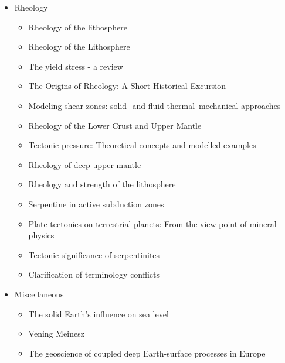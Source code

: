 \begin{itemize}
\item Rheology 
   \begin{itemize}
   \item [\nineteeneightythree] Rheology of the lithosphere \cite{kirb83}
   \item [\nineteeneightyseven] Rheology of the Lithosphere \cite{kikr87} \cite{ramu87}
   \item [\nineteenninetynine] The yield stress - a review \cite{barn99}
   \item [\twothousandtwo] The Origins of Rheology: A Short Historical Excursion \cite{dora02}
   \item [\twothousandthree] Modeling shear zones: solid- and fluid-thermal–mechanical approaches \cite{reyu03}
   \item [\twothousandeight] Rheology of the Lower Crust and Upper Mantle \cite{budr08}
   \item [\twothousandeight] Tectonic pressure: Theoretical concepts and modelled examples \cite{manc08}
   \item [\twothousandten] Rheology of deep upper mantle \cite{kara10}
   \item [\twothousandeleven] Rheology and strength of the lithosphere \cite{buro11}
   \item [\twothousandtwelve] Serpentine in active subduction zones \cite{reyn12}
   \item [\twothousandfourteen] Plate tectonics on terrestrial planets: From the view-point of mineral physics \cite{kara14}
   \item [\twothousandfifteen] Tectonic significance of serpentinites \cite{gusr15}
   \item [\twothousandtwentyone] Clarification of terminology conflicts \cite{wang21} 
   \end{itemize}

\item Miscellaneous
   \begin{itemize}
   \item The solid Earth’s influence on sea level \cite{conr13}  
   \item Vening Meinesz \cite{vlaa89}
   \item The geoscience of coupled deep Earth-surface processes in Europe \cite{clzb07}
   \end{itemize}


\end{itemize}
